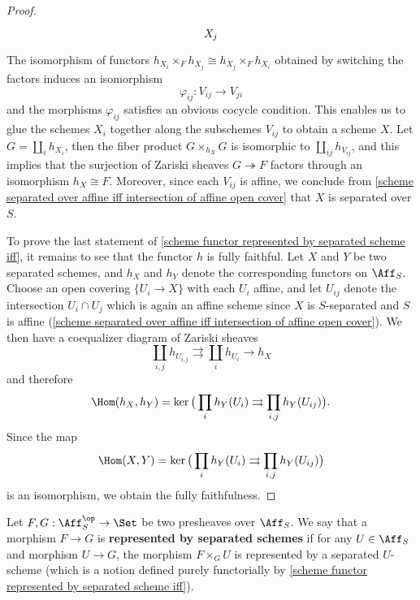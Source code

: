 \begin{proof}
\[\begin{tikzcd}
X_j
\end{tikzcd}\]
The isomorphism of functors $h_{X_i}\times_Fh_{X_j}\cong h_{X_j}\times_Fh_{X_i}$ obtained by switching the factors induces an isomorphism
\[\varphi_{ij}:V_{ij}\to V_{ji}\]
and the morphisms $\varphi_{ij}$ satisfies an obvious cocycle condition. This enables us to glue the schemes $X_i$ together along the subschemes $V_{ij}$ to obtain a scheme $X$. Let $G=\coprod_ih_{X_i}$, then the fiber product $G\times_{h_X}G$ is isomorphic to $\coprod_{ij}h_{V_{ij}}$, and this implies that the surjection of Zariski sheaves $G\twoheadrightarrow F$ factors through an isomorphism $h_X\cong F$. Moreover, since each $V_{ij}$ is affine, we conclude from \cref{scheme separated over affine iff intersection of affine open cover} that $X$ is separated over $S$.\par
To prove the last statement of \cref{scheme functor represented by separated scheme iff}, it remains to see that the functor $h$ is fully faithful. Let $X$ and $Y$ be two separated schemes, and $h_X$ and $h_Y$ denote the corresponding functors on $\Aff_S$. Choose an open covering $\{U_i\to X\}$ with each $U_i$ affine, and let $U_{ij}$ denote the intersection $U_i\cap U_j$ which is again an affine scheme since $X$ is $S$-separated and $S$ is affine (\ref{scheme separated over affine iff intersection of affine open cover}). We then have a coequalizer diagram of Zariski sheaves
\[\coprod_{i,j}h_{U_{i,j}}\rightrightarrows\coprod_ih_{U_i}\to h_X\]
and therefore
\[\Hom(h_X,h_Y)=\ker\big(\prod_ih_Y(U_i)\rightrightarrows\prod_{i,j}h_Y(U_{ij})\big).\]
Since the map
\[\Hom(X,Y)=\ker\big(\prod_ih_Y(U_i)\rightrightarrows\prod_{i,j}h_Y(U_{ij})\big)\]
is an isomorphism, we obtain the fully faithfulness.
\end{proof}

Let $F,G:\Aff_S^{\op}\to\Set$ be two presheaves over $\Aff_S$. We say that a morphism $F\to G$ is \textbf{represented by separated schemes} if for any $U\in\Aff_S$ and morphism $U\to G$, the morphism $F\times_GU$ is represented by a separated $U$-scheme (which is a notion defined purely functorially by \cref{scheme functor represented by separated scheme iff}).


